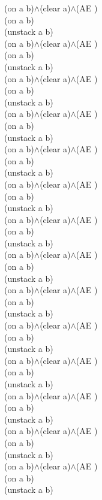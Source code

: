 {{(on a b)$\wedge$(clear a)$\wedge$(AE )\\
(on a b)\\
(unstack a b)\\
(on a b)$\wedge$(clear a)$\wedge$(AE )\\
(on a b)\\
(unstack a b)\\
(on a b)$\wedge$(clear a)$\wedge$(AE )\\
(on a b)\\
(unstack a b)\\
(on a b)$\wedge$(clear a)$\wedge$(AE )\\
(on a b)\\
(unstack a b)\\
(on a b)$\wedge$(clear a)$\wedge$(AE )\\
(on a b)\\
(unstack a b)\\
(on a b)$\wedge$(clear a)$\wedge$(AE )\\
(on a b)\\
(unstack a b)\\
(on a b)$\wedge$(clear a)$\wedge$(AE )\\
(on a b)\\
(unstack a b)\\
(on a b)$\wedge$(clear a)$\wedge$(AE )\\
(on a b)\\
(unstack a b)\\
(on a b)$\wedge$(clear a)$\wedge$(AE )\\
(on a b)\\
(unstack a b)\\
(on a b)$\wedge$(clear a)$\wedge$(AE )\\
(on a b)\\
(unstack a b)\\
(on a b)$\wedge$(clear a)$\wedge$(AE )\\
(on a b)\\
(unstack a b)\\
(on a b)$\wedge$(clear a)$\wedge$(AE )\\
(on a b)\\
(unstack a b)\\
(on a b)$\wedge$(clear a)$\wedge$(AE )\\
(on a b)\\
(unstack a b)\\
(on a b)$\wedge$(clear a)$\wedge$(AE )\\
(on a b)\\
(unstack a b)\\
}}

